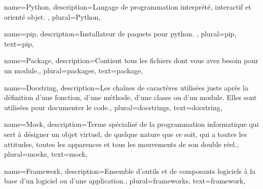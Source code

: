 {
    name={Python},
    description={Langage de programmation interprété, interactif et orienté objet. \cite{python}},
    plural={Python},
}

{
    name={pip},
    description={Installateur de \glspl{paquet} pour \gls{python}. \cite{pip}},
    plural={pip},
    text={pip},
}

{
    name={Package},
    description={Contient tous les fichiers dont vous avez besoin pour un module.},
    plural={packages},
    text={package},
}

{
    name={Docstring},
    description={Les chaînes de caractères utilisées juste après la définition d'une fonction, d'une méthode, d'une
            classe ou d'un module. Elles sont utilisées pour documenter le code.},
    plural={docstrings},
    text={docstring},
}

{
    name={Mock},
    description={Terme spécialisé de la programmation informatique qui sert à désigner un objet virtuel, de quelque
            nature que ce soit, qui a toutes les attitudes, toutes les apparences et tous les mouvements de son double
            réel.},
    plural={mocks},
    text={mock},
}

{
    name={Framework},
    description={Ensemble d'outils et de composants logiciels à la base d'un logiciel ou d'une application.},
    plural={frameworks},
    text={framework},
}